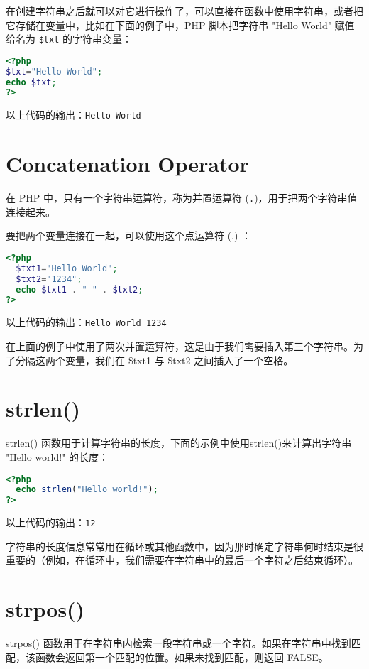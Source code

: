 在创建字符串之后就可以对它进行操作了，可以直接在函数中使用字符串，或者把它存储在变量中，比如在下面的例子中，PHP 脚本把字符串 "Hello World" 赋值给名为 \texttt{\$txt} 的字符串变量：


\begin{lstlisting}[language=PHP]
<?php
$txt="Hello World";
echo $txt;
?>
\end{lstlisting}


以上代码的输出：\verb|Hello World|


\section{Concatenation Operator}



在 PHP 中，只有一个字符串运算符，称为并置运算符 (\texttt{.})，用于把两个字符串值连接起来。

要把两个变量连接在一起，可以使用这个点运算符 (.) ：

\begin{lstlisting}[language=PHP]
<?php
  $txt1="Hello World";
  $txt2="1234";
  echo $txt1 . " " . $txt2;
?>
\end{lstlisting}


以上代码的输出：\verb|Hello World 1234|


在上面的例子中使用了两次并置运算符，这是由于我们需要插入第三个字符串。为了分隔这两个变量，我们在 \$txt1 与 \$txt2 之间插入了一个空格。


\section{strlen()}


strlen() 函数用于计算字符串的长度，下面的示例中使用strlen()来计算出字符串 "Hello world!" 的长度：

\begin{lstlisting}[language=PHP]
<?php
  echo strlen("Hello world!");
?>
\end{lstlisting}


以上代码的输出：\verb|12|

字符串的长度信息常常用在循环或其他函数中，因为那时确定字符串何时结束是很重要的（例如，在循环中，我们需要在字符串中的最后一个字符之后结束循环）。

\section{strpos()}

strpos() 函数用于在字符串内检索一段字符串或一个字符。如果在字符串中找到匹配，该函数会返回第一个匹配的位置。如果未找到匹配，则返回 FALSE。

